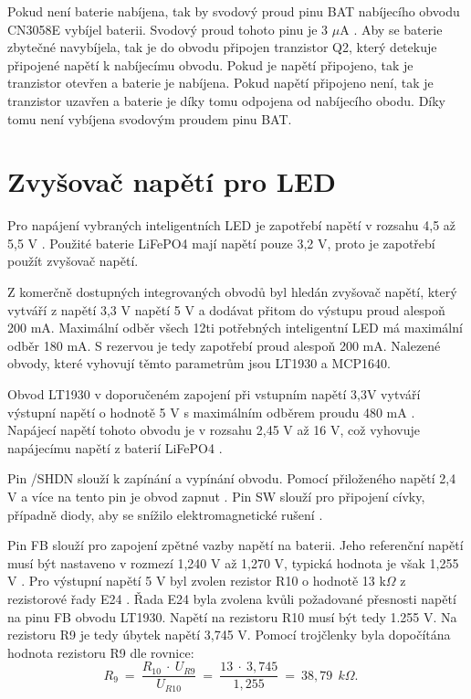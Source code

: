 
Pokud není baterie nabíjena, tak by svodový proud pinu BAT nabíjecího obvodu CN3058E vybíjel baterii. Svodový proud tohoto pinu je 3 $\mu$A \cite{charger_dtsh}. 
Aby se baterie zbytečné navybíjela, tak je do obvodu připojen tranzistor Q2, který detekuje připojené napětí k nabíjecímu obvodu. Pokud je napětí připojeno, tak je 
tranzistor otevřen a baterie je nabíjena. Pokud napětí připojeno není, tak je tranzistor uzavřen a baterie je díky tomu odpojena od nabíjecího obodu. Díky tomu 
není vybíjena svodovým proudem pinu BAT. 

\section{Zvyšovač napětí pro LED}
Pro napájení vybraných inteligentních LED je zapotřebí napětí v rozsahu 4,5 až 5,5 V \cite{WS2812C_dtsh}. Použité baterie LiFePO4 mají napětí pouze 3,2 V, proto je 
zapotřebí použít zvyšovač napětí. 

Z komerčně dostupných integrovaných obvodů byl hledán zvyšovač napětí, který vytváří z napětí 3,3 V napětí 5 V a dodávat přitom do výstupu proud alespoň 200 mA. 
Maximální odběr všech 12ti potřebných inteligentní LED má maximální odběr 180 mA. S rezervou je tedy zapotřebí proud alespoň 200 mA. Nalezené obvody, které vyhovují 
těmto parametrům jsou LT1930 a MCP1640. 

Obvod LT1930 v doporučeném zapojení při vstupním napětí 3,3V vytváří výstupní napětí o hodnotě 5 V s maximálním odběrem proudu 480 mA \cite{LT1930_dtsh}. Napájecí napětí 
tohoto obvodu je v rozsahu 2,45 V až 16 V, což vyhovuje napájecímu napětí z baterií LiFePO4 \cite{LT1930_dtsh}.



Pin /SHDN slouží k zapínání a vypínání obvodu. Pomocí přiloženého napětí 2,4 V a více na tento pin je obvod zapnut \cite{LT1930_dtsh}. Pin SW slouží pro  připojení cívky, 
případně diody, aby se snížilo elektromagnetické rušení \cite{LT1930_dtsh}. 

Pin FB slouží  pro zapojení zpětné vazby napětí na baterii. Jeho referenční napětí musí být nastaveno v rozmezí 1,240 V až 1,270 V, typická hodnota je však 1,255 V \cite{LT1930_dtsh}. 
Pro výstupní napětí 5 V byl zvolen rezistor R10 o hodnotě 13 k$\Omega$ z rezistorové řady E24 \cite{rezistorova_rada}. Řada E24 byla zvolena kvůli požadované přesnosti
napětí na pinu FB obvodu LT1930. Napětí na rezistoru R10 musí být tedy 1.255 V. Na rezistoru R9 je tedy úbytek napětí 3,745 V. Pomocí trojčlenky byla dopočítána hodnota 
rezistoru R9 dle rovnice:
\begin{equation} 
  R_{9}~=~\frac{R_{10}~\cdot~U_{R9}}{U_{R10}}~=~\frac{13~\cdot~3,745}{1,255}~=~38,79~\:k\Omega. 
  \quad
\label{eq:R9}
\end{equation}

